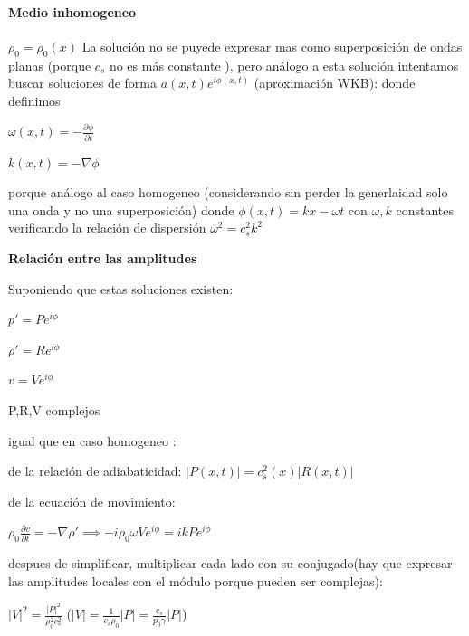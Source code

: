 \documentclass{article}
\begin{document}
\paragraph{Medio inhomogeneo} $\rho_0 = \rho_0(x)$
La solución no se puyede expresar mas como superposición de ondas planas (porque $c_s$ no es más constante ), pero análogo a esta solución intentamos  buscar soluciones de forma $a(x,t) e^{i\phi(x,t)}$ (aproximación WKB):
 donde definimos 
\begin{description}  
\item $\omega(x,t) = -\frac{\partial \phi}{\partial t}$
\item $k(x,t) = -\nabla \phi$
\end{description}
porque análogo al caso homogeneo (considerando sin perder la generlaidad solo una onda y no una superposición) donde $\phi(x,t) = kx-\omega t$ con $\omega, k$ constantes verificando la relación de dispersión $\omega^{2} = c_s^2 k^2  $  

\textbf{Relación entre las amplitudes}

\begin{description}  
\item Suponiendo que estas soluciones existen:
\item $p\prime = P e^{i\phi}$
\item $\rho\prime = R e^{i\phi}$
\item $v = V e^{i\phi}$
\item P,R,V  complejos
\end{description}

igual que en caso homogeneo :

\begin{description}  
\item de la relación de adiabaticidad: $|P(x,t)| = c_s^{2}(x) |R(x,t)|$
\item de la ecuación de movimiento: 
\item $\rho_0 \frac{\partial v}{\partial t} = -\nabla \rho\prime \implies -i \rho_0 \omega V e^{i\phi} = i k P e^{i\phi}$
\item despues de simplificar,  multiplicar cada lado con su conjugado(hay que expresar las amplitudes locales con el módulo porque pueden ser complejas):
\item  $|V|^2 = \frac{|P|^2}{\rho_0^{2} c_s^2}$ ($|V|= \frac{1}{c_s \rho_0} |P| = \frac{c_s}{p_0 \gamma} |P|$) 


\end{description}
\end{document}
